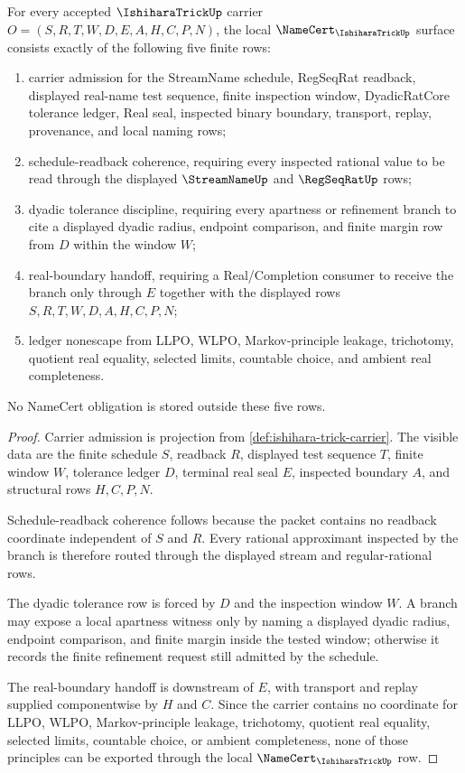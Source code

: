 \begin{theorem}
\label{thm:ishihara-trick-namecert-obligations}
For every accepted $\IshiharaTrickUp$ carrier $O=(S,R,T,W,D,E,A,H,C,P,N)$, the local $\NameCert_{\IshiharaTrickUp}$ surface consists exactly of the following five finite rows:
\begin{enumerate}
\item carrier admission for the StreamName schedule, RegSeqRat readback, displayed real-name test sequence, finite inspection window, DyadicRatCore tolerance ledger, Real seal, inspected binary boundary, transport, replay, provenance, and local naming rows;
\item schedule-readback coherence, requiring every inspected rational value to be read through the displayed $\StreamNameUp$ and $\RegSeqRatUp$ rows;
\item dyadic tolerance discipline, requiring every apartness or refinement branch to cite a displayed dyadic radius, endpoint comparison, and finite margin row from $D$ within the window $W$;
\item real-boundary handoff, requiring a Real/Completion consumer to receive the branch only through $E$ together with the displayed rows $S,R,T,W,D,A,H,C,P,N$;
\item ledger nonescape from LLPO, WLPO, Markov-principle leakage, trichotomy, quotient real equality, selected limits, countable choice, and ambient real completeness.
\end{enumerate}
No NameCert obligation is stored outside these five rows.
\end{theorem}
\begin{proof}
Carrier admission is projection from \autoref{def:ishihara-trick-carrier}. The visible data are the finite schedule $S$, readback $R$, displayed test sequence $T$, finite window $W$, tolerance ledger $D$, terminal real seal $E$, inspected boundary $A$, and structural rows $H,C,P,N$.

Schedule-readback coherence follows because the packet contains no readback coordinate independent of $S$ and $R$. Every rational approximant inspected by the branch is therefore routed through the displayed stream and regular-rational rows.

The dyadic tolerance row is forced by $D$ and the inspection window $W$. A branch may expose a local apartness witness only by naming a displayed dyadic radius, endpoint comparison, and finite margin inside the tested window; otherwise it records the finite refinement request still admitted by the schedule.

The real-boundary handoff is downstream of $E$, with transport and replay supplied componentwise by $H$ and $C$. Since the carrier contains no coordinate for LLPO, WLPO, Markov-principle leakage, trichotomy, quotient real equality, selected limits, countable choice, or ambient completeness, none of those principles can be exported through the local $\NameCert_{\IshiharaTrickUp}$ row.
\end{proof}

